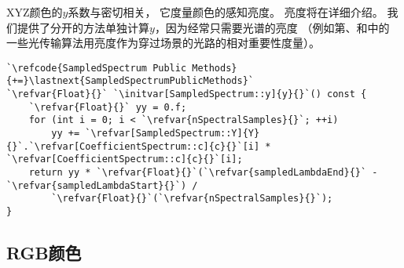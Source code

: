 XYZ颜色的$y$系数与密切相关，
它度量颜色的感知亮度。
亮度将在详细介绍。
我们提供了分开的方法单独计算$y$，因为经常只需要光谱的亮度
（例如第、和中的
一些光传输算法用亮度作为穿过场景的光路的相对重要性度量）。
\begin{lstlisting}
`\refcode{SampledSpectrum Public Methods}{+=}\lastnext{SampledSpectrumPublicMethods}`
`\refvar{Float}{}` `\initvar[SampledSpectrum::y]{y}{}`() const { 
    `\refvar{Float}{}` yy = 0.f;
    for (int i = 0; i < `\refvar{nSpectralSamples}{}`; ++i)
        yy += `\refvar[SampledSpectrum::Y]{Y}{}`.`\refvar[CoefficientSpectrum::c]{c}{}`[i] * `\refvar[CoefficientSpectrum::c]{c}{}`[i];
    return yy * `\refvar{Float}{}`(`\refvar{sampledLambdaEnd}{}` - `\refvar{sampledLambdaStart}{}`) /
        `\refvar{Float}{}`(`\refvar{nSpectralSamples}{}`);
}
\end{lstlisting}

\subsection{RGB颜色}\label{sub:RGB颜色}

